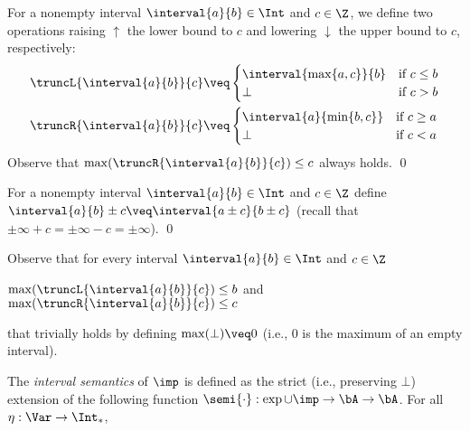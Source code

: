 \begin{definition}
  \label{de:trunc}
  For a nonempty interval \(\interval{a}{b} \in \Int\) and \(c \in \Z\), we define
  two operations raising \(\uparrow\) the lower bound to \(c\) and lowering \(\downarrow\) the upper
  bound to \(c\), respectively:
  \begin{align*}
    &\truncL{\interval{a}{b}}{c} \veq 
    \begin{cases} 
      \interval{\max\{a,c\}}{b} & \text{if } c\leq b\\
      \bot & \text{if } c > b
    \end{cases}
    \\
    &\truncR{\interval{a}{b}}{c} \veq 
    \begin{cases}   
      \interval{a}{\min\{b,c\}} & \text{if } c\geq a\\
      \bot & \text{if } c < a 
    \end{cases} 
  \end{align*}
  Observe that \(\max(\truncR{\interval{a}{b}}{c})\leq c\) always holds. \qed   
\end{definition}

\begin{definition}
  \label{de:add}
  For a nonempty interval \(\interval{a}{b} \in \Int\) and \(c \in \Z\) define
  \(\interval{a}{b} \pm c \veq \interval{a\pm c}{b\pm c}\) (recall that \(\pm \infty + c = \pm\infty - c = \pm\infty\)).  
  \qed
\end{definition}


Observe that for every interval \(\interval{a}{b} \in \Int\) and
\(c \in \Z\)
\begin{center}
  \(\max(\truncL{\interval{a}{b}}{c}) \leq b\)
  \qquad and \qquad
  \(\max(\truncR{\interval{a}{b}}{c}) \leq c\)
\end{center}
that trivially holds by 
defining \(\max (\bot)  \veq 0\) (i.e., \(0\) is the maximum of
an empty interval).

The \emph{interval semantics} of \(\imp\) is defined as the strict
(i.e., preserving \(\bot\))
extension of the following function \(\semi{\cdot}: \exp \cup \imp \to
\bA \to \bA\). For all \(\eta: \Var \to \Int_*\),

